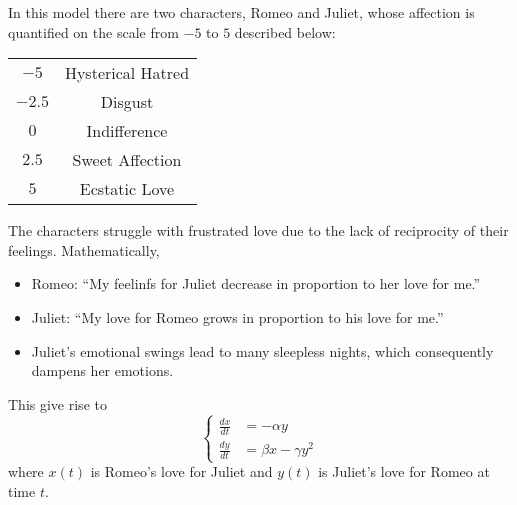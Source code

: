\begin{problem}
    In this model there are two characters, Romeo and Juliet, whose affection is
    quantified on the scale from $-5$ to $5$ described below:
    \begin{center}
        \begin{tabular}{|c|c|}
            \hline
            $-5$ & Hysterical Hatred \\
            $-2.5$ & Disgust \\
            $0$ & Indifference \\
            $2.5$ & Sweet Affection \\
            $5$ & Ecstatic Love\\
            \hline
        \end{tabular}
    \end{center}
    The characters struggle with frustrated love due to the lack of reciprocity of their
    feelings.  Mathematically,
    \begin{itemize}
        \item Romeo: ``My feelinfs for Juliet decrease in proportion to her love for me.''
        \item Juliet: ``My love for Romeo grows in proportion to his love for me.''
        \item Juliet's emotional swings lead to many sleepless nights, which consequently
            dampens her emotions.
    \end{itemize}
    This give rise to
    \[ \left\{ \begin{array}{ll} \frac{dx}{dt} &= -\alpha y \\ \frac{dy}{dt} &= \beta x -
            \gamma y^2 \end{array} \right. \]
    where $x(t)$ is Romeo's love for Juliet and $y(t)$ is Juliet's love for Romeo at time
    $t$.


\end{problem}
